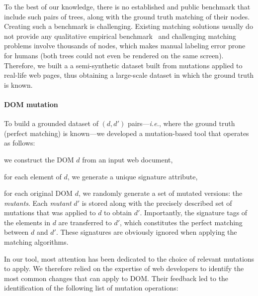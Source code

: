 To the best of our knowledge, there is no established and public benchmark that include such pairs of trees, along with the ground truth matching of their nodes. Creating such a benchmark is challenging.
Existing matching solutions usually do not provide any qualitative empirical benchmark~\cite{Bunke1998ASubgraph,Dinitz1998OnIsomorphism, jiang1994alignment,valiente2001efficient,Wang2001FindingHierarchy,zhang1995algorithms} and challenging matching problems involve thousands of nodes, which makes manual labeling error prone for humans (both trees could not even be rendered on the same screen).
Therefore, we built a a semi-synthetic dataset built from mutations applied to real-life web pages, thus obtaining a large-scale dataset in which the ground truth is known.

\paragraph{DOM mutation}
To build a grounded dataset of $(d,d')$ pairs---\emph{i.e.}, where the ground truth (perfect matching) is known---we developed a mutation-based tool that operates as follows:
\begin{compactenum}
	\item we construct the DOM $d$ from an input web document,
    \item for each element of $d$, we generate a unique signature attribute,
    \item for each original DOM $d$, we randomly generate a set of mutated versions: the \textit{mutants}.
    Each \textit{mutant} $d'$ is stored along with the precisely described set of mutations that was applied to $d$ to obtain $d'$.
    Importantly, the signature tags of the elements in $d$ are transferred to $d'$, which constitutes the perfect matching between $d$ and $d'$. These signatures are obviously ignored when applying the matching algorithms.
\end{compactenum}

In our tool, most attention has been dedicated to the choice of relevant mutations to apply.
We therefore relied on the expertise of web developers to identify the most common changes that can apply to DOM.
Their feedback led to the identification of the following list of mutation operations:

